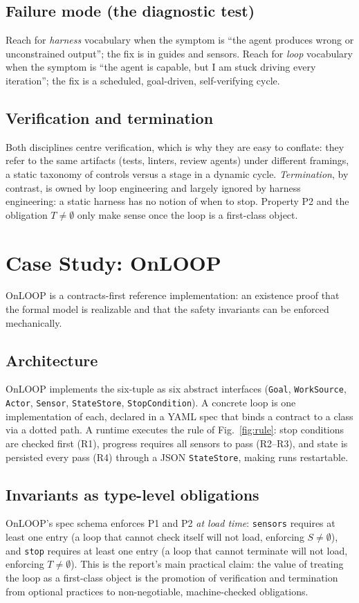 \documentclass[10pt,twocolumn,letterpaper]{article}
\begin{document}
\subsection{Failure mode (the diagnostic test)}
Reach for \emph{harness} vocabulary when the symptom is ``the agent produces
wrong or unconstrained output''; the fix is in guides and sensors. Reach for
\emph{loop} vocabulary when the symptom is ``the agent is capable, but I am
stuck driving every iteration''; the fix is a scheduled, goal-driven,
self-verifying cycle.

\subsection{Verification and termination}
Both disciplines centre verification, which is why they are easy to conflate:
they refer to the same artifacts (tests, linters, review agents) under different
framings, a static taxonomy of controls versus a stage in a dynamic cycle.
\emph{Termination}, by contrast, is owned by loop engineering and largely
ignored by harness engineering: a static harness has no notion of when to stop.
Property P2 and the obligation $T \neq \emptyset$ only make sense once the loop
is a first-class object.

\section{Case Study: OnLOOP}
\label{sec:onloop}
OnLOOP is a contracts-first reference implementation: an existence proof that the
formal model is realizable and that the safety invariants can be enforced
mechanically.

\subsection{Architecture}
OnLOOP implements the six-tuple as six abstract interfaces (\texttt{Goal},
\texttt{WorkSource}, \texttt{Actor}, \texttt{Sensor}, \texttt{StateStore},
\texttt{StopCondition}). A concrete loop is one implementation of each, declared
in a YAML spec that binds a contract to a class via a dotted path. A runtime
executes the rule of Fig.~\ref{fig:rule}: stop conditions are checked first
(R1), progress requires all sensors to pass (R2--R3), and state is persisted
every pass (R4) through a JSON \texttt{StateStore}, making runs restartable.

\subsection{Invariants as type-level obligations}
OnLOOP's spec schema enforces P1 and P2 \emph{at load time}: \texttt{sensors}
requires at least one entry (a loop that cannot check itself will not load,
enforcing $S \neq \emptyset$), and \texttt{stop} requires at least one entry (a
loop that cannot terminate will not load, enforcing $T \neq \emptyset$). This is
the report's main practical claim: the value of treating the loop as a
first-class object is the promotion of verification and termination from
optional practices to non-negotiable, machine-checked obligations.
\end{document}
